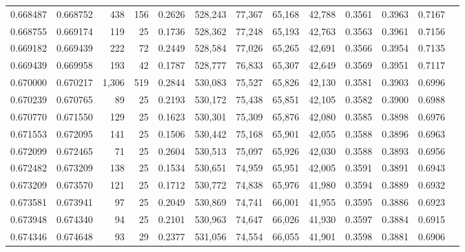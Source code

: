 \begin{tabular}{rrrrrrrrrrrrr}
0.668487 & 0.668752 &   438 & 156 &                                     0.2626 & 528,243 &  77,367 &  65,168 &  42,788 & 0.3561 & 0.3963 & 0.7167 \\
0.668755 & 0.669174 &   119 &  25 &                                     0.1736 & 528,362 &  77,248 &  65,193 &  42,763 & 0.3563 & 0.3961 & 0.7156 \\
0.669182 & 0.669439 &   222 &  72 &                                     0.2449 & 528,584 &  77,026 &  65,265 &  42,691 & 0.3566 & 0.3954 & 0.7135 \\
0.669439 & 0.669958 &   193 &  42 &                                     0.1787 & 528,777 &  76,833 &  65,307 &  42,649 & 0.3569 & 0.3951 & 0.7117 \\
0.670000 & 0.670217 & 1,306 & 519 &                                     0.2844 & 530,083 &  75,527 &  65,826 &  42,130 & 0.3581 & 0.3903 & 0.6996 \\
0.670239 & 0.670765 &    89 &  25 &                                     0.2193 & 530,172 &  75,438 &  65,851 &  42,105 & 0.3582 & 0.3900 & 0.6988 \\
0.670770 & 0.671550 &   129 &  25 &                                     0.1623 & 530,301 &  75,309 &  65,876 &  42,080 & 0.3585 & 0.3898 & 0.6976 \\
0.671553 & 0.672095 &   141 &  25 &                                     0.1506 & 530,442 &  75,168 &  65,901 &  42,055 & 0.3588 & 0.3896 & 0.6963 \\
0.672099 & 0.672465 &    71 &  25 &                                     0.2604 & 530,513 &  75,097 &  65,926 &  42,030 & 0.3588 & 0.3893 & 0.6956 \\
0.672482 & 0.673209 &   138 &  25 &                                     0.1534 & 530,651 &  74,959 &  65,951 &  42,005 & 0.3591 & 0.3891 & 0.6943 \\
0.673209 & 0.673570 &   121 &  25 &                                     0.1712 & 530,772 &  74,838 &  65,976 &  41,980 & 0.3594 & 0.3889 & 0.6932 \\
0.673581 & 0.673941 &    97 &  25 &                                     0.2049 & 530,869 &  74,741 &  66,001 &  41,955 & 0.3595 & 0.3886 & 0.6923 \\
0.673948 & 0.674340 &    94 &  25 &                                     0.2101 & 530,963 &  74,647 &  66,026 &  41,930 & 0.3597 & 0.3884 & 0.6915 \\
0.674346 & 0.674648 &    93 &  29 &                                     0.2377 & 531,056 &  74,554 &  66,055 &  41,901 & 0.3598 & 0.3881 & 0.6906 \\

\end{tabular}
